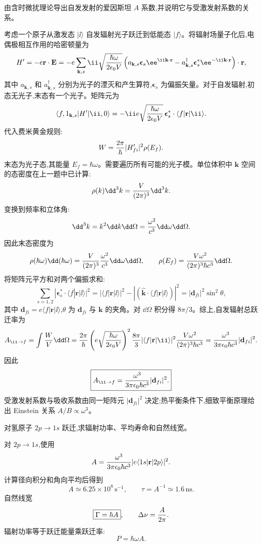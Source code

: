 \begin{question}
由含时微扰理论导出自发发射的爱因斯坦 $A$ 系数,并说明它与受激发射系数的关系。
\begin{solution}
考虑一个原子从激发态 $|\ii\rangle$ 自发辐射光子跃迁到低能态 $|f\rangle$。将辐射场量子化后,电偶极相互作用的哈密顿量为
\[
H'=-e\mathbf r\cdot\mathbf E=-e\sum_{\mathbf k,s}\ii\sqrt{\hbar\omega\over2\epsilon_0 V}
\left(a_{\mathbf k,s}\boldsymbol\epsilon_s\ee^{\ii\mathbf k\cdot\mathbf r}-a^\dagger_{\mathbf k,s}\boldsymbol\epsilon_s^* \ee^{-\ii\mathbf k\cdot\mathbf r}\right)\cdot\mathbf r,
\]
其中 $a_{\mathbf k,s}$ 和 $a^\dagger_{\mathbf k,s}$ 分别为光子的湮灭和产生算符,$\boldsymbol\epsilon_s$ 为偏振矢量。对于自发辐射,初态无光子,末态有一个光子。矩阵元为
\[
\langle f,1_{\mathbf k,s}|H'|\ii,0\rangle
=-\ii e\sqrt{\hbar\omega\over2\epsilon_0 V}\,\boldsymbol\epsilon_s^*\cdot\langle f|\mathbf r|\ii\rangle.
\]
代入费米黄金规则:
\[
W={2\pi\over\hbar}|H'_{fi}|^2\rho(E_f).
\]
末态为光子态,其能量 $E_f=\hbar\omega$。需要遍历所有可能的光子模。单位体积中 $\mathbf k$ 空间的态密度在上一题中已计算:
\[
\rho(k)\dd^3k={V\over(2\pi)^3}\dd^3k.
\]
变换到频率和立体角:
\[
\dd^3k=k^2\dd k\dd\Omega={\omega^2\over c^3}\dd\omega\dd\Omega.
\]
因此末态密度为
\[
\rho(\hbar\omega)\dd(\hbar\omega)={V\over(2\pi)^3}{\omega^2\over c^3}\dd\omega\dd\Omega,
\qquad
\rho(E_f)={V\omega^2\over(2\pi)^3\hbar c^3}\dd\Omega.
\]
将矩阵元平方和对两个偏振求和:
\[
\sum_{s=1,2}|\boldsymbol\epsilon_s^*\cdot\langle f|\mathbf r|\ii\rangle|^2
=|\langle f|\mathbf r|\ii\rangle|^2-|(\hat{\mathbf k}\cdot\langle f|\mathbf r|\ii\rangle)|^2
=|\mathbf d_{fi}|^2\sin^2\theta,
\]
其中 $\mathbf d_{fi}=e\langle f|\mathbf r|\ii\rangle$,$\theta$ 为 $\mathbf d_{fi}$ 与 $\mathbf k$ 的夹角。对 $\dd\Omega$ 积分得 $8\pi/3$。综上,自发辐射总跃迁率为
\[
A_{\ii\to f}=\int{W\over V}\dd\Omega
={2\pi\over\hbar}\left(e\sqrt{\hbar\omega\over2\epsilon_0 V}\right)^2
{8\pi\over3}|\langle f|\mathbf r|\ii\rangle|^2{V\omega^2\over(2\pi)^3\hbar c^3}
={\omega^3\over3\pi\epsilon_0\hbar c^3}|\mathbf d_{fi}|^2.
\]
因此
\[
\boxed{A_{\ii\to f}={\omega^3\over3\pi\epsilon_0\hbar c^3}|\mathbf d_{fi}|^2.}
\]
受激发射系数与吸收系数由同一矩阵元 $|\mathbf d_{fi}|^2$ 决定;热平衡条件下,细致平衡原理给出 Einstein 关系 $A/B\propto\omega^3$。
\end{solution}
\end{question}

\begin{question}
对氢原子 $2p\to1s$ 跃迁,求辐射功率、平均寿命和自然线宽。
\begin{solution}
对 $2p\to1s$,使用
\[
A={\omega^3\over3\pi\epsilon_0\hbar c^3}|e\langle1s|\mathbf r|2p\rangle|^2.
\]
计算径向积分和角向平均后得到
\[
\boxed{A\simeq6.25\times10^8\,\mathrm{s}^{-1}},\qquad
\boxed{\tau=A^{-1}\simeq1.6\,\mathrm{ns}}.
\]
自然线宽
\[
\boxed{\Gamma=\hbar A},\qquad
\Delta\nu={A\over2\pi}.
\]
辐射功率等于跃迁能量乘跃迁率:
\[
\boxed{P=\hbar\omega A}.
\]
\end{solution}
\end{question}

